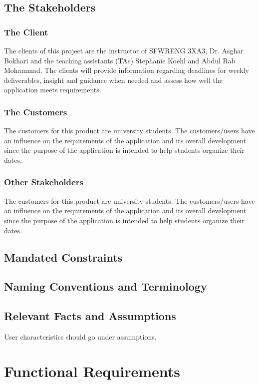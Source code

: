 \documentclass[12pt, titlepage]{article}
\begin{document}
\subsection{The Stakeholders}

\subsubsection{The Client}
The clients of this project are the instructor of SFWRENG 3XA3, Dr. Asghar Bokhari and the teaching assistants (TAs) Stephanie Koehl and Abdul Rab Mohammad. The clients will provide information regarding deadlines for weekly deliverables, insight and guidance when needed and assess how well the application meets requirements.  

\subsubsection{The Customers}
The customers for this product are university students. The customers/users have an influence on the requirements of the application and its overall development since the purpose of the application is intended to help students organize their dates.  

\subsubsection{Other Stakeholders}
The customers for this product are university students. The customers/users have an influence on the requirements of the application and its overall development since the purpose of the application is intended to help students organize their dates.  

\subsection{Mandated Constraints}

\subsection{Naming Conventions and Terminology}

\subsection{Relevant Facts and Assumptions}

User characteristics should go under assumptions.


\section{Functional Requirements}
\end{document}
